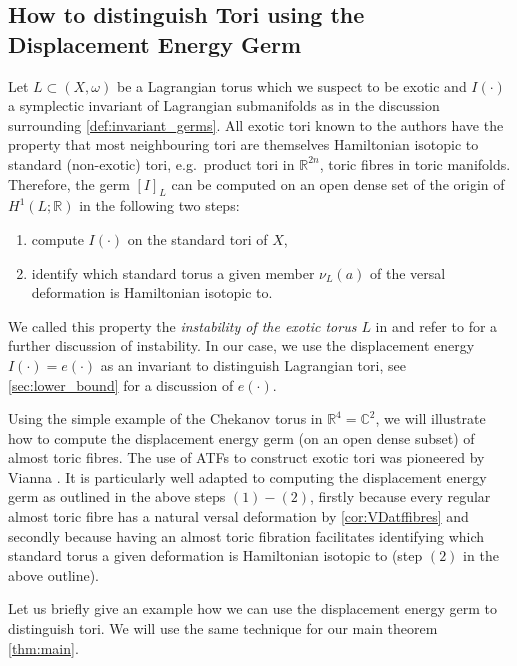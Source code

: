 \documentclass[12pt,a4paper,draft]{scrartcl}
\begin{document}
\subsection{How to distinguish Tori using the Displacement Energy Germ}

   Let $L \subset (X,\omega)$ be a Lagrangian torus which we suspect to be exotic and $I(\cdot)$ a symplectic invariant of Lagrangian submanifolds as in the discussion surrounding \cref{def:invariant_germs}. All exotic tori known to the authors have the property that most neighbouring tori are themselves Hamiltonian isotopic to standard (non-exotic) tori, e.g.\ product tori in $\mathbb{R}^{2n}$, toric fibres in toric manifolds. Therefore, the germ $[I]_L$ can be computed on an open dense set of the origin of $H^1(L;\mathbb{R})$ in the following two steps: 
\begin{enumerate}
    \item compute $I(\cdot)$ on the standard tori of $X$, 
    \item identify which standard torus a given member $\nu_L(a)$ of the versal deformation is Hamiltonian isotopic to. 
\end{enumerate}
We called this property the \textit{instability of the exotic torus $L$} in \cite{brendel2023local} and refer to \cite[Sections 1.6, 5.1]{brendel2023local} for a further discussion of instability. In our case, we use the displacement energy $I(\cdot) = e(\cdot)$ as an invariant to distinguish Lagrangian tori, see \cref{sec:lower_bound} for a discussion of $e(\cdot)$.


Using the simple example of the Chekanov torus in $\mathbb{R}^4 = \mathbb{C}^2$, we will illustrate how to compute the displacement energy germ (on an open dense subset) of almost toric fibres. The use of ATFs to construct exotic tori was pioneered by Vianna \cite{Via16,Via17}. It is particularly well adapted to computing the displacement energy germ as outlined in the above steps $(1)-(2)$, firstly because every regular almost toric fibre has a natural versal deformation by \cref{cor:VDatffibres} and secondly because having an almost toric fibration facilitates identifying which standard torus a given deformation is Hamiltonian isotopic to (step $(2)$ in the above outline).





Let us briefly give an example how we can use the displacement energy germ to distinguish tori.
We will use the same technique for our main theorem \cref{thm:main}.
\end{document}
